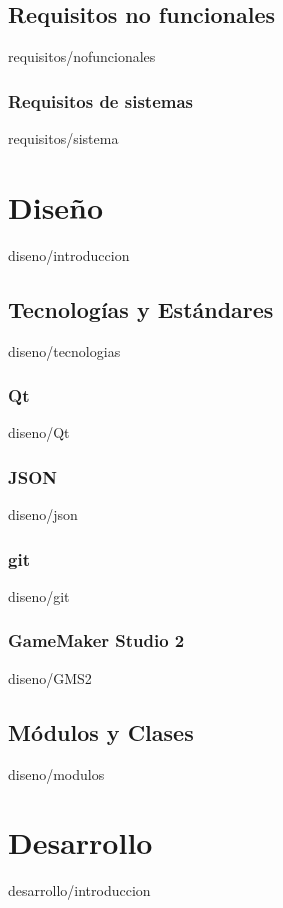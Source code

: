 \documentclass[epsbased,lof,loc,copyright,final,extendedindex,firstnumbered,tfg,gnuplot]{tfgtfmthesisuam}
\begin{document}
	\section{Requisitos no funcionales\label{SEC:REQUISITOSNOFUNCIONALES}}{requisitos/nofuncionales}
		\begin{nonfunctional}
			\subsection{Requisitos de sistemas\label{SUBSEC:REQSISTEMA}}{requisitos/sistema}
		\end{nonfunctional}
	
\chapter{Diseño\label{CAP:DISENO}}{diseno/introduccion} %
	\section{Tecnologías y Estándares\label{SEC:TECNOLOGIAS}}{diseno/tecnologias}
		\subsection{Qt\label{SUBSEC:QT}}{diseno/Qt}
		\subsection{JSON\label{SUBSEC:JSON}}{diseno/json}
		\subsection{git\label{SUBSEC:GIT}}{diseno/git}
		\subsection{GameMaker Studio 2\label{SUBSEC:GMS2}}{diseno/GMS2}
	\section{Módulos y Clases\label{SEC:MODULOS}}{diseno/modulos}

\chapter{Desarrollo\label{CAP:DESARROLLO}}{desarrollo/introduccion}
\end{document}
